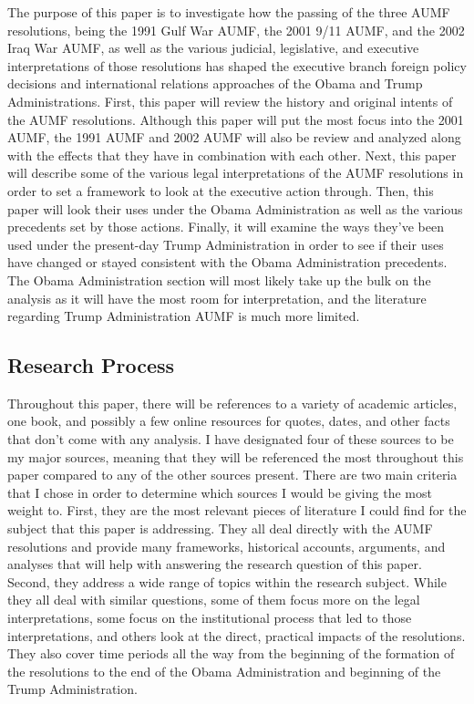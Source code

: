 \documentclass[12pt]{article}
\begin{document}
The purpose of this paper is to investigate how the passing of the three AUMF resolutions, being the 1991 Gulf War AUMF, the 2001 9/11 AUMF, and the 2002 Iraq War AUMF, as well as the various judicial, legislative, and executive interpretations of those resolutions has shaped the executive branch foreign policy decisions and international relations approaches of the Obama and Trump Administrations.
First, this paper will review the history and original intents of the AUMF resolutions.
Although this paper will put the most focus into the 2001 AUMF, the 1991 AUMF and 2002 AUMF will also be review and analyzed along with the effects that they have in combination with each other.
Next, this paper will describe some of the various legal interpretations of the AUMF resolutions in order to set a framework to look at the executive action through.
Then, this paper will look their uses under the Obama Administration as well as the various precedents set by those actions.
Finally, it will examine the ways they've been used under the present-day Trump Administration in order to see if their uses have changed or stayed consistent with the Obama Administration precedents.
The Obama Administration section will most likely take up the bulk on the analysis as it will have the most room for interpretation, and the literature regarding Trump Administration AUMF is much more limited.

\subsection*{Research Process}
Throughout this paper, there will be references to a variety of academic articles, one book, and possibly a few online resources for quotes, dates, and other facts that don't come with any analysis.
I have designated four of these sources to be my major sources, meaning that they will be referenced the most throughout this paper compared to any of the other sources present.
There are two main criteria that I chose in order to determine which sources I would be giving the most weight to.
First, they are the most relevant pieces of literature I could find for the subject that this paper is addressing.
They all deal directly with the AUMF resolutions and provide many frameworks, historical accounts, arguments, and analyses that will help with answering the research question of this paper.
Second, they address a wide range of topics within the research subject.
While they all deal with similar questions, some of them focus more on the legal interpretations, some focus on the institutional process that led to those interpretations, and others look at the direct, practical impacts of the resolutions.
They also cover time periods all the way from the beginning of the formation of the resolutions to the end of the Obama Administration and beginning of the Trump Administration.
\end{document}
